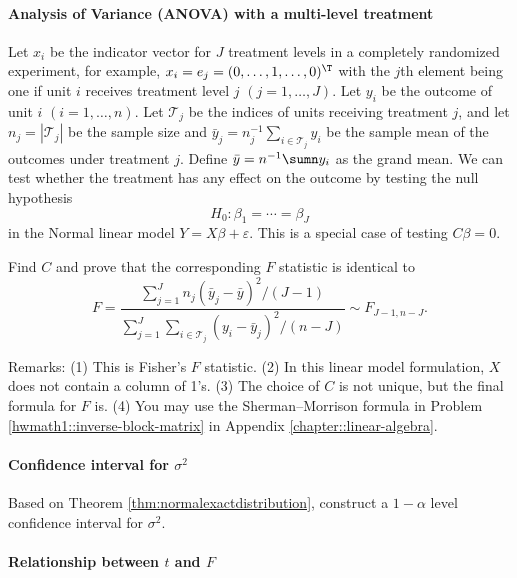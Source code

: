 \paragraph{Analysis of Variance (ANOVA) with a multi-level treatment}\label{hw5:anova-f}

Let $x_{i}$ be the indicator vector for $J$ treatment levels in
a completely randomized experiment, for example, $x_{i} = e_j=(0,\ldots,1,\ldots,0)^{\T} $
with the $j$th element being one if unit $i$ receives treatment
level $j$ $(j=1,\ldots,J)$. Let $y_{i}$ be the outcome of unit
$i$ $(i=1,\ldots,n)$. Let $\mathcal T_{j}$ be the indices of units receiving
treatment $j$, and let $n_{j}=|\mathcal T_{j}|$ be the sample size and $\bar{y}_{j} = n_j^{-1} \sum_{i\in \mathcal T_j} y_i$ be the sample
mean of the outcomes under treatment $j$. Define $\bar{y} = n^{-1} \sumn y_i$ as the grand mean. We can test whether the treatment
has any effect on the outcome by testing the null hypothesis 
\[
H_{0}:\beta_{1}=\cdots=\beta_{J}
\] 
in the Normal linear model $Y=X\beta+\varepsilon$.
This is a special case of testing $C\beta=0$. 

Find $C$ and prove that the corresponding $F$ statistic is identical to 
\[
F=\frac{\sum_{j=1}^{J}n_{j}(\bar{y}_{j}-\bar{y})^{2}/(J-1)}{\sum_{j=1}^{J}\sum_{i\in \mathcal T_{j}}(y_{i}-\bar{y}_{j})^{2}/(n-J)}\sim F_{J-1,n-J}.
\]


Remarks: (1)
This is Fisher's $F$ statistic. (2) In this linear model formulation, $X$ does not contain a column of 1's. (3) The choice of $C$ is not
unique, but the final formula for $F$ is. (4) You may use the Sherman--Morrison formula in Problem \ref{hwmath1::inverse-block-matrix} in Appendix \ref{chapter::linear-algebra}. 







 


\paragraph{Confidence interval for $\sigma^2$}\label{hw5::confidence-interval-sigma2}

Based on Theorem \ref{thm:normalexactdistribution}, construct a $1-\alpha$ level confidence interval for $\sigma^2$. 


\paragraph{Relationship between $t$ and $F$}\label{hw5::T-F-1dim}


